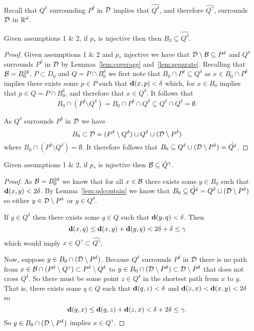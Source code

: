 Recall that $Q^\delta$ surrounding $P^\delta$ in ${\mathcal{D}}$ implies that $\hat{Q^\delta}$, and therefore $\hat{Q^\gamma}$, surrounds ${\mathcal{D}}$ in $\mathbb{R}^d$.

\begin{lemma}\label{lem:qdcontain}
  Given assumptions 1 \& 2, if $p_*$ is injective then then $B_0\subseteq \hat{Q^\delta}$.
\end{lemma}
\begin{proof}
  Given assumptions 1 \& 2 and $p_*$ injective we have that ${\mathcal{D}}\setminus {\mathcal{B}}\subseteq P^\delta$ and $Q^\delta$ surrounds $P^\delta$ in ${\mathcal{D}}$ by Lemmas~\ref{lem:coverage} and~\ref{lem:separate}.
  Recalling that ${\mathcal{B}} = B_0^{2\delta}$, $P\subset D_0$ and $Q = P\cap B_0^\delta$ we first note that $B_0\cap P^\delta\subseteq Q^\delta$ as $x\in B_0\cap P^\delta$ implies there exists some $p\in P$ such that $\mathbf{d}(x, p) < \delta$ which, for $x\in B_0$ implies that $p\in Q = P\cap B_0^\delta$, and therefore that $x\in Q^\delta$.
  It follows that
  \[B_0\cap (P^\delta\setminus Q^\delta) = B_0\cap P^\delta\cap \overline{Q^\delta} \subseteq Q^\delta\cap\overline{Q^\delta} = \emptyset.\]

  As $Q^\delta$ surrounds $P^\delta$ in ${\mathcal{D}}$ we have
  \[ B_0 \subset {\mathcal{D}} = (P^\delta\setminus Q^\delta)\sqcup Q^\delta \sqcup ({\mathcal{D}}\setminus P^\delta)\]
  where $B_0\cap (P^\delta\setminus Q^\delta) = \emptyset$.
  It therefore follows that $B_0\subseteq Q^\delta \sqcup ({\mathcal{D}}\setminus P^\delta) = \hat{Q^\delta}$.
\end{proof}

\begin{lemma}\label{lem:qcontain}
    Given assumptions 1 \& 2, if $p_*$ is injective then ${\mathcal{B}}\subseteq \hat{Q}^\gamma$.
\end{lemma}
\begin{proof}
  As ${\mathcal{B}} = B_0^{2\delta}$ we know that for all $x\in{\mathcal{B}}$ there exists some $y\in B_0$ such that $\mathbf{d}(x, y) < 2\delta$.
  By Lemma~\ref{lem:qdcontain} we know that $B_0\subseteq \hat{Q^\delta} = Q^\delta\sqcup ({\mathcal{D}}\setminus P^\delta)$ so either $y\in {\mathcal{D}}\setminus P^\delta$ or $y\in Q^\delta$.

  If $y\in Q^\delta$ then there exists some $q\in Q$ such that $\mathbf{d}(y, q)<\delta$.
  Then
  \[ \mathbf{d}(x, q)\leq \mathbf{d}(x, y) + \mathbf{d}(y, q) < 2\delta + \delta \leq \gamma \]
  which would imply $x\in Q^\gamma\subset \hat{Q^\gamma}$.

  Now, suppose $y\in B_0\cap ({\mathcal{D}}\setminus P^\delta)$.
  Because $Q^\delta$ surrounds $P^\delta$ in ${\mathcal{D}}$ there is no path from $x\in {\mathcal{B}}\cap (P^\delta\setminus Q^\gamma)\subset P^\delta\setminus Q^\delta$ to $y\in B_0\cap ({\mathcal{D}}\setminus P^\delta)\subset {\mathcal{D}}\setminus P^\delta$ that does not cross $Q^\delta$.
  So there must be some point $z\in Q^\delta$ in the shortest path from $x$ to $y$.
  That is, there exists some $q\in Q$ such that $\mathbf{d}(q, z) < \delta$ and $\mathbf{d}(z, x) < \mathbf{d}(x, y) < 2\delta$ so
  \[ \mathbf{d}(q, x)\leq \mathbf{d}(q, z) + \mathbf{d}(z, x) < \delta + 2\delta \leq \gamma. \]
  So $y\in B_0\cap ({\mathcal{D}}\setminus P^\delta)$ implies $x\in Q^\gamma$.
\end{proof}

